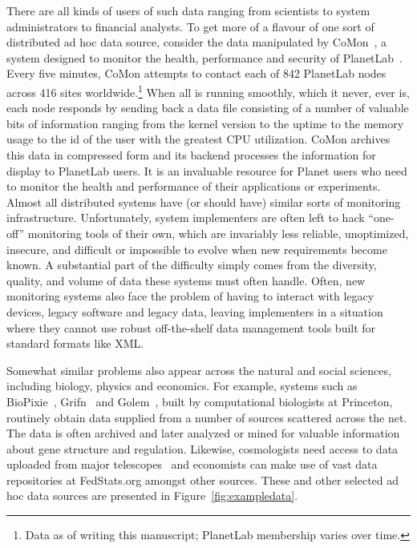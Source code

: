 \documentclass[nocopyrightspace]{sigplanconf}
\begin{document}
There are all kinds of users of such data ranging from scientists to
system administrators to financial analysts.  To get more of a flavour
of one sort of distributed ad hoc data source, consider the data
manipulated by CoMon~\cite{comon}, a system designed to monitor the
health, performance and security of PlanetLab~\cite{planetlab}.  Every
five minutes, CoMon attempts to contact each of 842 PlanetLab nodes
across 416 sites worldwide.\footnote{Data as of writing this manuscript;
PlanetLab membership varies over time.}  
When all is running smoothly, which it
never, ever is, each node responds by sending back a data file
consisting of a number of valuable bits of information ranging from
the kernel version to the uptime to the memory usage to the id of the
user with the greatest CPU utilization.  CoMon archives this data in
compressed form and its backend processes the information for display
to PlanetLab users.  It is an invaluable resource for Planet users
who need to monitor the health and performance of their applications
or experiments.  Almost all distributed systems have (or should
have) similar sorts of monitoring infrastructure.  Unfortunately,
system implementers are often left
to hack ``one-off'' monitoring tools of their own, which are
invariably less reliable, unoptimized, insecure, and difficult or
impossible to evolve when new requirements become known.
A substantial part of the difficulty simply comes from the diversity, quality,
and volume of data these systems must often handle. Often, new
monitoring systems also face the problem of having to interact with legacy
devices, legacy software and legacy data, leaving implementers in a
situation where they cannot use robust off-the-shelf data management
tools built for standard formats like XML.

Somewhat similar problems also appear
across the natural and social sciences, including biology,
physics and economics.  For example, systems such as BioPixie~\cite{biopixie}, Grifn~\cite{grifn} and Golem~\cite{golem}, built by
computational biologists at Princeton,
routinely obtain data supplied from a number of sources scattered 
across the net.  The data is often archived and later analyzed or mined 
for valuable information about gene structure and regulation.  Likewise, 
cosmologists need access to data uploaded from major telescopes~\cite{sdss}
and economists can make use of vast data repositories at FedStats.org
amongst other sources.  These and other selected ad hoc data sources 
are presented in Figure~\ref{fig:exampledata}.
\end{document}
